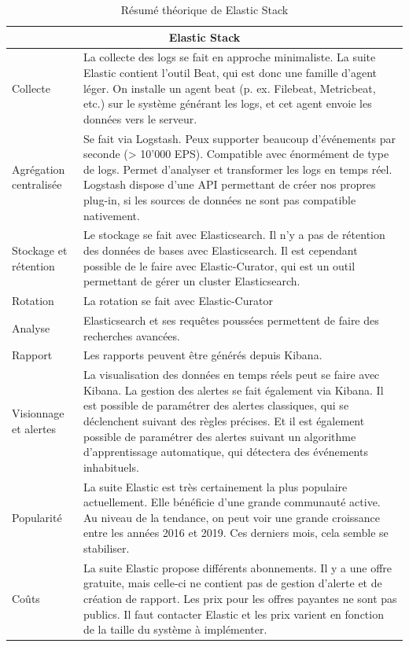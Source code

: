 \documentclass[paper=a4, fontsize=11pt]{scrartcl}
\begin{document}
\begin{table}[H]
\centering
\begin{tabular}{ |p{4cm}||p{13cm}|  }
    \hline
    \multicolumn{2}{|c|}{Elastic Stack} \\
    \hline
    Collecte & La collecte des logs se fait en approche minimaliste. La suite Elastic contient l'outil Beat, qui est donc une famille d'agent léger. On installe un agent beat (p. ex. Filebeat, Metricbeat, etc.) sur le système générant les logs, et cet agent envoie les données vers le serveur.\\
    \hline
    Agrégation centralisée & Se fait via Logstash. Peux supporter beaucoup d'événements par seconde (> 10'000 EPS). Compatible avec énormément de type de logs. Permet d'analyser et transformer les logs en temps réel. Logstash dispose d'une API permettant de créer nos propres plug-in, si les sources de données ne sont pas compatible nativement.\\
    \hline
    Stockage et rétention & Le stockage se fait avec Elasticsearch. Il n'y a pas de rétention des données de bases avec Elasticsearch. Il est cependant possible de le faire avec Elastic-Curator, qui est un outil permettant de gérer un cluster Elasticsearch.\\
    \hline
    Rotation & La rotation se fait avec Elastic-Curator\\
    \hline
    Analyse & Elasticsearch et ses requêtes poussées permettent de faire des recherches avancées.\\
    \hline
    Rapport & Les rapports peuvent être générés depuis Kibana.\\
    \hline
    Visionnage et alertes & La visualisation des données en temps réels peut se faire avec Kibana. La gestion des alertes se fait également via Kibana. Il est possible de paramétrer des alertes classiques, qui se déclenchent suivant des règles précises. Et il est également possible de paramétrer des alertes suivant un algorithme d'apprentissage automatique, qui détectera des événements inhabituels.\\
    \hline
    Popularité & La suite Elastic est très certainement la plus populaire actuellement. Elle bénéficie d'une grande communauté active. Au niveau de la tendance, on peut voir une grande croissance entre les années 2016 et 2019. Ces derniers mois, cela semble se stabiliser.\\
    \hline
    Coûts &  La suite Elastic propose différents abonnements. Il y a une offre gratuite, mais celle-ci ne contient pas de gestion d'alerte et de création de rapport. Les prix pour les offres payantes ne sont pas publics. Il faut contacter Elastic et les prix varient en fonction de la taille du système à implémenter.\\
    \hline
\end{tabular}
\caption{Résumé théorique de Elastic Stack}
\label{t-resumeELK}
\end{table}
\end{document}
